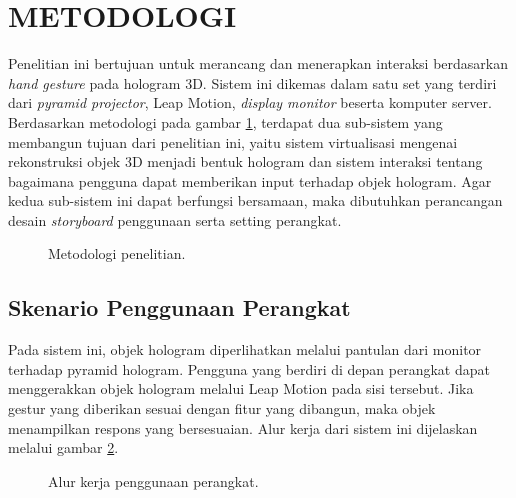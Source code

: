 \documentclass[conference]{IEEEtran}
\begin{document}
\section{METODOLOGI}
	Penelitian ini bertujuan untuk merancang dan menerapkan interaksi berdasarkan \textit{hand gesture} pada hologram 3D. Sistem ini dikemas dalam satu set yang terdiri dari \textit{pyramid projector}, Leap Motion, \textit{display monitor} beserta komputer server. Berdasarkan metodologi pada gambar \ref{fig:metodologi}, terdapat dua sub-sistem yang membangun tujuan dari penelitian ini, yaitu sistem virtualisasi mengenai rekonstruksi objek 3D menjadi bentuk hologram dan sistem interaksi tentang bagaimana pengguna dapat memberikan input terhadap objek hologram. Agar kedua sub-sistem ini dapat berfungsi bersamaan, maka dibutuhkan perancangan desain \textit{storyboard} penggunaan serta setting perangkat.
	\vspace{-2ex}
	\begin{figure}[h]
		\caption{Metodologi penelitian.}
		\label{fig:metodologi}
	\end{figure}
	\vspace{-2ex}
	
	\subsection{Skenario Penggunaan Perangkat}
		Pada sistem ini, objek hologram diperlihatkan melalui pantulan dari monitor terhadap pyramid hologram. Pengguna yang berdiri di depan perangkat dapat menggerakkan objek hologram melalui Leap Motion pada sisi tersebut. Jika gestur yang diberikan sesuai dengan fitur yang dibangun, maka objek menampilkan respons yang bersesuaian. Alur kerja dari sistem ini dijelaskan melalui gambar \ref{fig:alurkerja}.
		\vspace{-2ex}
		\begin{figure}[h]
			\caption{Alur kerja penggunaan perangkat.}
			\label{fig:alurkerja}
		\end{figure}
		\vspace{-2ex}
	
\end{document}
